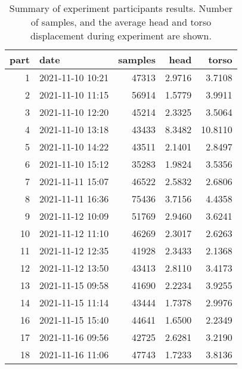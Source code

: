 \begin{table}
\centering
\caption{Summary of experiment participants results.  Number of samples, and the average head and torso displacement during experiment are shown.}
\label{table-subject-summary}
\begin{tabular}{rlrrr}
\toprule
part &             date & samples &   head &   torso \\
\midrule
   1 & 2021-11-10 10:21 &   47313 & 2.9716 &  3.7108 \\
   2 & 2021-11-10 11:15 &   56914 & 1.5779 &  3.9911 \\
   3 & 2021-11-10 12:20 &   45214 & 2.3325 &  3.5064 \\
   4 & 2021-11-10 13:18 &   43433 & 8.3482 & 10.8110 \\
   5 & 2021-11-10 14:22 &   43511 & 2.1401 &  2.8497 \\
   6 & 2021-11-10 15:12 &   35283 & 1.9824 &  3.5356 \\
   7 & 2021-11-11 15:07 &   46522 & 2.5832 &  2.6806 \\
   8 & 2021-11-11 16:36 &   75436 & 3.7156 &  4.4358 \\
   9 & 2021-11-12 10:09 &   51769 & 2.9460 &  3.6241 \\
  10 & 2021-11-12 11:10 &   46269 & 2.3017 &  2.6263 \\
  11 & 2021-11-12 12:35 &   41928 & 2.3433 &  2.1368 \\
  12 & 2021-11-12 13:50 &   43413 & 2.8110 &  3.4173 \\
  13 & 2021-11-15 09:58 &   41690 & 2.2234 &  3.9255 \\
  14 & 2021-11-15 11:14 &   43444 & 1.7378 &  2.9976 \\
  16 & 2021-11-15 15:40 &   44641 & 1.6500 &  2.2349 \\
  17 & 2021-11-16 09:56 &   42725 & 2.6281 &  3.2190 \\
  18 & 2021-11-16 11:06 &   47743 & 1.7233 &  3.8136 \\
\bottomrule
\end{tabular}
\end{table}

